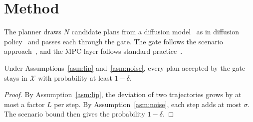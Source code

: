 \section{Method}\label{sec:method}
The planner draws $N$ candidate plans from a diffusion model~\cite{ho2020denoising,ho2020ddpm} as in diffusion policy~\cite{chi2023diffusion} and passes
each through the gate. The gate follows the scenario approach~\cite{campi2008exact}, and the
MPC layer follows standard practice~\cite{rawlings2017model}.

\begin{theorem}\label{thm:main}
Under Assumptions~\ref{asm:lip} and~\ref{asm:noise}, every plan accepted by the gate stays in
$\mathcal{X}$ with probability at least $1-\delta$.
\end{theorem}

\begin{proof}
By Assumption~\ref{asm:lip}, the deviation of two trajectories grows by at most a factor $L$
per step. By Assumption~\ref{asm:noise}, each step adds at most $\sigma$. The scenario bound
then gives the probability $1-\delta$.
\end{proof}
